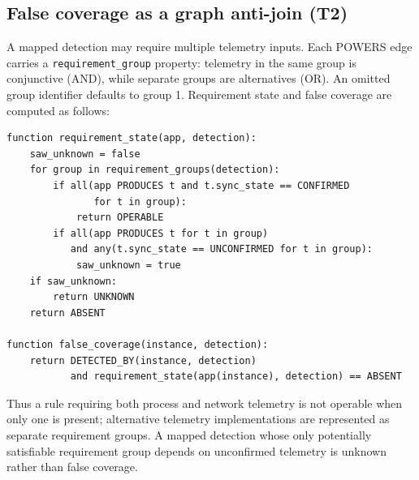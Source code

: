 \documentclass[10pt]{article}
\newcommand{\code}[1]{\texttt{#1}}
\begin{document}
\subsection{False coverage as a graph anti-join (T2)}
A mapped detection may require multiple telemetry inputs. Each POWERS edge carries a \code{requirement\_group} property: telemetry in the same group is conjunctive (AND), while separate groups are alternatives (OR). An omitted group identifier defaults to group 1. Requirement state and false coverage are computed as follows:
\begin{Verbatim}[fontsize=\small]
function requirement_state(app, detection):
    saw_unknown = false
    for group in requirement_groups(detection):
        if all(app PRODUCES t and t.sync_state == CONFIRMED
               for t in group):
            return OPERABLE
        if all(app PRODUCES t for t in group)
           and any(t.sync_state == UNCONFIRMED for t in group):
            saw_unknown = true
    if saw_unknown:
        return UNKNOWN
    return ABSENT

function false_coverage(instance, detection):
    return DETECTED_BY(instance, detection)
           and requirement_state(app(instance), detection) == ABSENT
\end{Verbatim}
Thus a rule requiring both process and network telemetry is not operable when only one is present; alternative telemetry implementations are represented as separate requirement groups. A mapped detection whose only potentially satisfiable requirement group depends on unconfirmed telemetry is unknown rather than false coverage.
\end{document}
